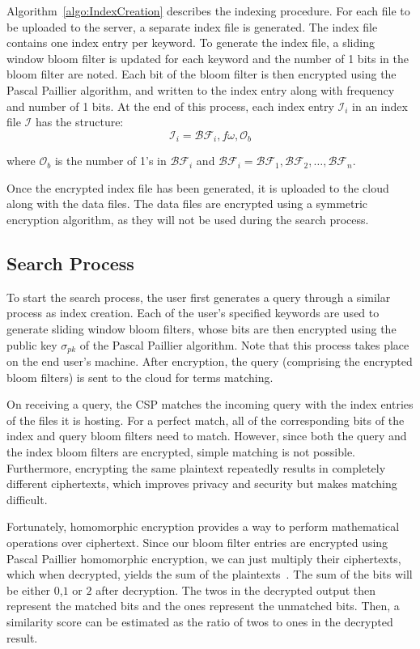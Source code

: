 Algorithm~\ref{algo:IndexCreation} describes the indexing procedure.
For each file to be uploaded to the server, a separate index file is generated. The index
file contains one index entry per keyword. To generate the index file, a sliding window bloom
filter is updated for each keyword and the number of 1 bits in the bloom filter are noted.
Each bit of the bloom filter is then encrypted using the Pascal Paillier algorithm, and written to 
the index entry along with frequency and number of 1 bits.
At the end of this process, each index entry $\mathcal{I}_i$ in an index file $\mathcal{I}$ has
the structure: 
\begin{equation}
\mathcal{I}_i = \mathcal{BF}_i, f\omega,\mathcal{O}_b
  \label{eq: indexEntry}
\end{equation} 

where $\mathcal{O}_b$ is the number of 1's in 
$\mathcal{BF}_i$ and 
$\mathcal{BF}_i= \mathcal{BF}_1,\mathcal{BF}_2, \ldots ,\mathcal{BF}_n$.

Once the encrypted index file has been generated, it is uploaded to the cloud along with the data files.
The data files are encrypted using a symmetric encryption algorithm, as they will not be used during the
search process.

\subsection{Search Process}

To start the search process, the user first generates a query through a similar process as index creation. 
Each of the user's specified keywords are used to generate sliding window bloom filters, whose bits are then
encrypted using the public key $\sigma_{pk}$ of the Pascal Paillier algorithm. 
Note that this process takes place on the end user's machine. After encryption, 
the query (comprising the encrypted bloom filters) is sent to the cloud for terms matching.

On receiving a query, the CSP matches the incoming query with the index entries of 
the files it is hosting. For a perfect match, all of the corresponding bits of the index 
and query bloom filters need to match. However, since both the query and the index
bloom filters are encrypted, simple matching is not possible. Furthermore, encrypting the
same plaintext repeatedly results in completely different ciphertexts, which improves
privacy and security but makes matching difficult.

Fortunately, homomorphic encryption provides a way to perform mathematical operations 
over ciphertext. Since our bloom filter entries are encrypted using Pascal Paillier homomorphic
encryption, we can just multiply their ciphertexts, which when decrypted, yields the sum of
the plaintexts~\cite{pascal}. The sum of the bits will be either $0$,$1$ or $2$ after decryption.
The twos in the decrypted output then represent the matched
bits and the ones represent the unmatched bits. Then, a similarity score
can be estimated as the ratio of twos to ones in the decrypted result.


